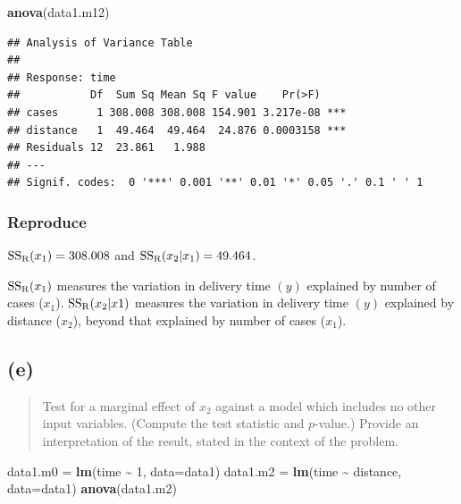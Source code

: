 \documentclass[
]{article}
\newenvironment{Shaded}{\begin{snugshade}}{\end{snugshade}}
\newcommand{\AttributeTok}[1]{\textcolor[rgb]{0.13,0.29,0.53}{#1}}
\newcommand{\DecValTok}[1]{\textcolor[rgb]{0.00,0.00,0.81}{#1}}
\newcommand{\FunctionTok}[1]{\textcolor[rgb]{0.13,0.29,0.53}{\textbf{#1}}}
\newcommand{\NormalTok}[1]{#1}
\newcommand{\OtherTok}[1]{\textcolor[rgb]{0.56,0.35,0.01}{#1}}
\newcommand{\SpecialCharTok}[1]{\textcolor[rgb]{0.81,0.36,0.00}{\textbf{#1}}}
\begin{document}
\begin{Shaded}
\begin{Highlighting}[]
\FunctionTok{anova}\NormalTok{(data1.m12)}
\end{Highlighting}
\end{Shaded}

\begin{verbatim}
## Analysis of Variance Table
## 
## Response: time
##           Df  Sum Sq Mean Sq F value    Pr(>F)    
## cases      1 308.008 308.008 154.901 3.217e-08 ***
## distance   1  49.464  49.464  24.876 0.0003158 ***
## Residuals 12  23.861   1.988                      
## ---
## Signif. codes:  0 '***' 0.001 '**' 0.01 '*' 0.05 '.' 0.1 ' ' 1
\end{verbatim}

\hypertarget{reproduce-3}{%
\subsubsection{Reproduce}\label{reproduce-3}}

\(\mathrm{SS_{R}}(x_1) = 308.008\) and \(\mathrm{SS_{R}}(x_2|x_1) = 49.464\).

\(\mathrm{SS_{R}}(x_1)\) measures the variation in delivery time \((y)\)
explained by number of cases (\(x_1\)). \(\mathrm{SS_{R}}(x_2|x1)\) measures the
variation in delivery time \((y)\) explained by distance (\(x_2\)),
beyond that explained by number of cases (\(x_1\)).

\hypertarget{e}{%
\subsection{(e)}\label{e}}

\begin{quote}
Test for a marginal effect of \(x_2\) against a model which includes no
other input variables. (Compute the test statistic and \(p\)-value.)
Provide an interpretation of the result, stated in the context of the
problem.
\end{quote}

\begin{Shaded}
\begin{Highlighting}[]
\NormalTok{data1.m0 }\OtherTok{=} \FunctionTok{lm}\NormalTok{(time }\SpecialCharTok{\textasciitilde{}} \DecValTok{1}\NormalTok{, }\AttributeTok{data=}\NormalTok{data1)}
\NormalTok{data1.m2 }\OtherTok{=} \FunctionTok{lm}\NormalTok{(time }\SpecialCharTok{\textasciitilde{}}\NormalTok{ distance, }\AttributeTok{data=}\NormalTok{data1)}
\FunctionTok{anova}\NormalTok{(data1.m2)}
\end{Highlighting}
\end{Shaded}
\end{document}
